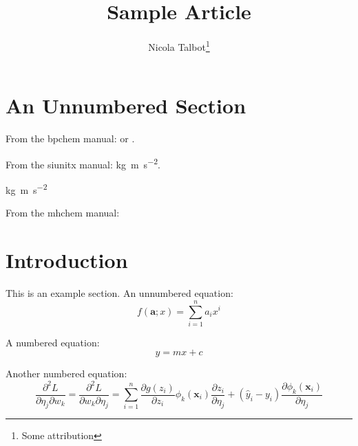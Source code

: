 \documentclass{article}
\title{Sample Article}
\author{Nicola Talbot\thanks{Some attribution}}
\newcommand*{\pfrac}[2]{\frac{\partial#1}{\partial#2}}
\newcommand*{\dpfrac}[3]{\frac{\partial^2#1}{\partial#2\partial#3}}
\renewcommand*{\vec}[1]{\boldsymbol{#1}}
\begin{document}
\maketitle

\tableofcontents

\begin{abstract}
\lipsum[1]
\end{abstract}

\section*{An Unnumbered Section}

\lipsum[4-5]

From the bpchem manual:
 or .

\bpalpha \bpbeta \bpDelta
\HNMR \CNMR \cis \trans {}

From the siunitx manual:
\si{\kilo\gram\metre\per\square\second}.

\si{kg.m.s^{-2}}

From the mhchem manual:









\section{Introduction}
\label{sec:intro}

This is an example section. An unnumbered equation:
\[
  f(\vec{a}; x) = \sum_{i=1}^n a_i x^i
\]

A numbered equation:
\begin{equation}
y = m x + c
\label{eq:mx+c}
\end{equation}

Another numbered equation:
\begin{equation}\label{eq:dp}
 \dpfrac{L}{\eta_j}{w_k}
 = \dpfrac{L}{w_k}{\eta_j}
 = \sum_{i=1}^n \pfrac{g(z_i)}{z_i}
   \phi_k(\vec{x}_i)\pfrac{z_i}{\eta_j}
 + (\hat{y}_i - y_i)\pfrac{\phi_k(\vec{x}_i)}{\eta_j}
\end{equation}
\end{document}
